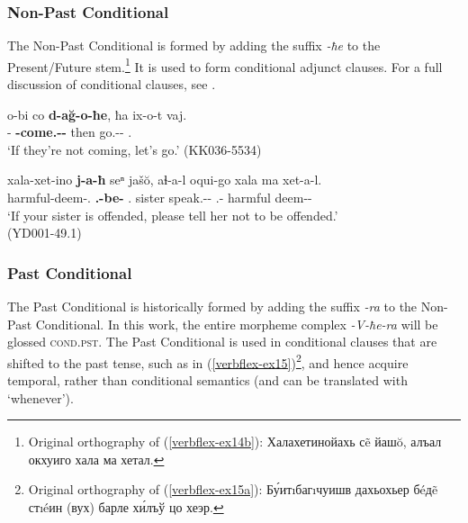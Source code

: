 \subsubsection{Non-Past Conditional}

The Non-Past Conditional is formed by adding the suffix \textit{-ħe} to the Present/Future stem.\footnote{Original orthography of (\ref{verbflex-ex14b}): Халахетинойахь с\~{e} йаш\u{o}, алъал окхуиго хала ма хетал.} It is used to form conditional adjunct clauses. For a full discussion of conditional clauses, see .

\begin{exe}
	\ex\label{verbflex-ex14}
	\begin{xlist}
		
		\ex\label{verbflex-ex14a}
		\gll o-bi co \textbf{d-a\u{g}-o-ħe}, ħa ix-o-t vaj. \\
		{\Dist}-{\Pl} {\Neg} \textbf{{\D}-come.{\Ipfv}-{\Npst}-{\Cond}} then go.{\Ipfv}-{\Npst}-{\Pl} {\Fpl}.{\Incl} \\
		\trans `If they're not coming, let's go.'
		\hfill (KK036-5534)
		
		\ex\label{verbflex-ex14b}
		\gll xala-xet-ino \textbf{j-a-ħ} seⁿ jaš\u{o}, aɬ-a-l oqui-go xala ma xet-a-l. \\
		harmful-deem-{\Ptcp}.{\Pst} \textbf{{\F}.{\Sg}-be-{\Cond}} {\Fsg}.{\Gen} sister speak.{\Pfv}-{\Imp}-{\Pol} {\Dist}.{\Obl}-{\All} harmful {\Proh} deem-{\Imp}-{\Pol} \\
		\trans `If your sister is offended, please tell her not to be offended.' \\
		\hfill (YD001-49.1)
		
	\end{xlist}
\end{exe}

\subsubsection{Past Conditional}

The Past Conditional is historically formed by adding the suffix \textit{-ra} to the Non-Past Conditional. In this work, the entire morpheme complex \textit{-V-ħe-ra} will be glossed \textsc{cond.pst}. The Past Conditional is used in conditional clauses that are shifted to the past tense, such as in (\ref{verbflex-ex15})\footnote{Original orthography of (\ref{verbflex-ex15a}): Б\'{у}итıбагıчуишв дахьохьер бéд\~{e} стıéин (вух) барле х\'{и}лъ\u{у} цо хеэр.}, and hence acquire temporal, rather than conditional semantics (and can be translated with `whenever').



